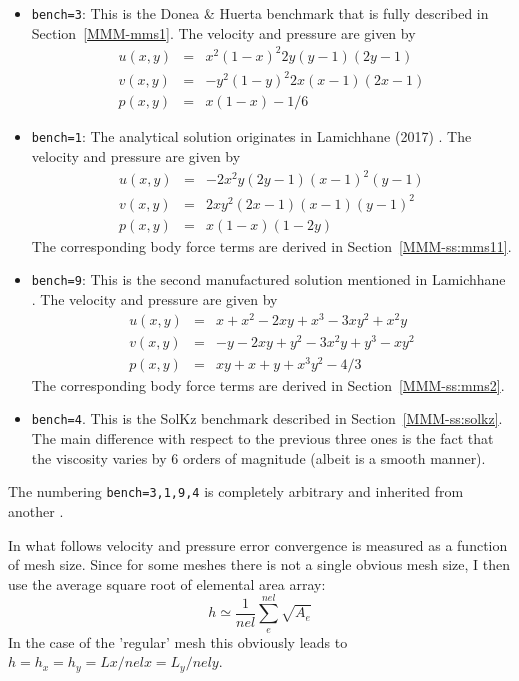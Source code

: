 \begin{itemize}
\item {\tt bench=3}: 
This is the Donea \& Huerta benchmark that is fully described in Section~\ref{MMM-mms1}.
The velocity and pressure are given by
\begin{eqnarray}
u(x,y) &=& x^2(1-x)^2 2y (y-1)(2y-1) \\ 
v(x,y) &=& -y^2 (1 - y)^2 2x (x-1)(2x-1) \\ 
p(x,y) &=& x(1 -x)- 1/6 
\end{eqnarray}

\item {\tt bench=1}:  
The analytical solution originates in Lamichhane (2017) \cite{lami17}.
The velocity and pressure are given by
\begin{eqnarray}
u(x,y)&=&-2x^2y(2y-1)(x-1)^2(y-1) \\
v(x,y)&=& 2xy^2(2x-1)(x-1)(y-1)^2 \\
p(x,y)&=& x(1-x)(1-2y)
\end{eqnarray}
The corresponding body force terms are derived in Section~\ref{MMM-ss:mms11}. 

\item {\tt bench=9}: 
This is the second manufactured solution 
mentioned in Lamichhane \cite{lami17}. 
The velocity and pressure are given by
\begin{eqnarray}
u(x,y) &=& x+x^2 - 2xy+x^3 - 3xy^2 + x^2y \\
v(x,y) &=& -y-2xy+y^2 -3x^2y + y^3 - xy^2 \\
p(x,y) &=& xy+x+y+x^3y^2 - 4/3
\end{eqnarray}
The corresponding body force terms are derived in Section~\ref{MMM-ss:mms2}. 

\item {\tt bench=4}. This is the SolKz benchmark described in Section~\ref{MMM-ss:solkz}.
The main difference with respect to the previous three ones is the fact that the viscosity
varies by 6 orders of magnitude (albeit is a smooth manner).


\end{itemize}

The numbering {\tt bench=3,1,9,4} is completely arbitrary and inherited from another \stone.

In what follows velocity and pressure error convergence is measured as a function of
mesh size. Since for some meshes there is not a single obvious mesh size, 
I then use the average square root of elemental area array:
\[
h \simeq \frac{1}{nel}\sum_e^{nel} \sqrt{A_e} 
\]
In the case of the 'regular' mesh this obviously leads to $h=h_x=h_y=Lx/{nelx}=L_y/nely$.


